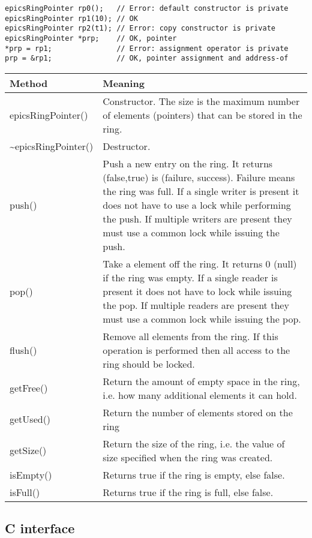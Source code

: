 \begin{verbatim}epicsRingPointer rp0();   // Error: default constructor is private
epicsRingPointer rp1(10); // OK
epicsRingPointer rp2(t1); // Error: copy constructor is private
epicsRingPointer *prp;    // OK, pointer
*prp = rp1;               // Error: assignment operator is private
prp = &rp1;               // OK, pointer assignment and address-of
\end{verbatim}
\begin{center}\begin{longtable}{p{1.27778in}p{5.0in}}
\textbf{Method} & \textbf{Meaning}\\
\hline
epicsRingPointer() & Constructor. The size is the maximum number of elements (pointers) that can be stored in the ring.\\
\~{}epicsRingPointer() & Destructor.\\
push() & Push a new entry on the ring. It returns (false,true) is (failure, success). Failure means the ring was full. If a single writer is present it does not have to use a lock while performing the push. If multiple writers are present they must use a common lock while issuing the push. \\
pop() & Take a element off the ring. It returns 0 (null) if the ring was empty. If a single reader is present it does not have to lock while issuing the pop. If multiple readers are present they must use a common lock while issuing the pop.\\
flush() & Remove all elements from the ring. If this operation is performed then all access to the ring should be locked.\\
getFree() & Return the amount of empty space in the ring, i.e. how many additional elements it can hold.\\
getUsed() & Return the number of elements stored on the ring\\
getSize() & Return the size of the ring, i.e. the value of size specified when the ring was created.\\
isEmpty() & Returns true if the ring is empty, else false.\\
isFull() & Returns true if the ring is full, else false.
\end{longtable}\end{center}


\subsection{C interface}

